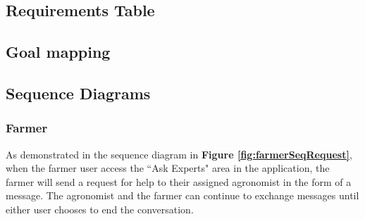 



\clearpage

\subsection{Requirements Table}



\subsection{Goal mapping}




\newpage
\subsection{Sequence Diagrams}

\subsubsection{Farmer}

\begin{flushleft}
As demonstrated in the sequence diagram in \textbf{Figure \ref{fig:farmerSeqRequest}}, when the farmer user access the “Ask Experts" area in the application, the farmer will send a request for help to their assigned agronomist in the form of a message. The agronomist and the farmer can continue to exchange messages until either user chooses to end the conversation.
\end{flushleft}

